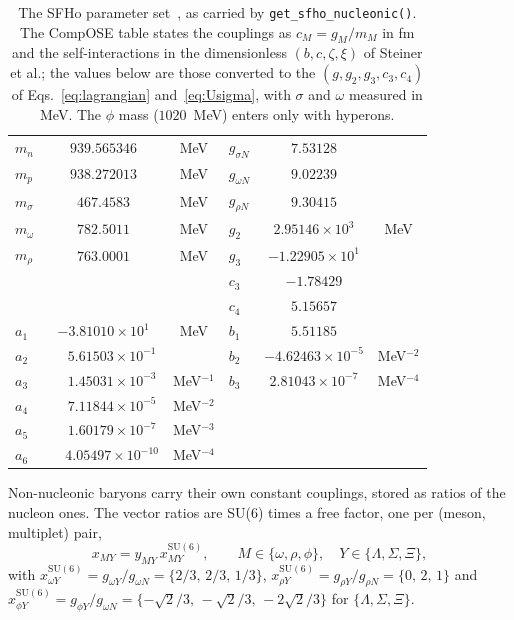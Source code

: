 \documentclass[aps,prc,onecolumn,superscriptaddress,nofootinbib,10pt]{revtex4-2}
\begin{document}
\begin{table}[b]
\caption{The SFHo parameter set~\cite{Steiner2013}, as carried by
\texttt{get\_sfho\_nucleonic()}. The CompOSE table states the couplings as
$c_M = g_M/m_M$ in fm and the self-interactions in the dimensionless
$(b, c, \zeta, \xi)$ of Steiner et al.; the values below are those converted
to the $(g, g_2, g_3, c_3, c_4)$ of Eqs.~\eqref{eq:lagrangian}
and~\eqref{eq:Usigma}, with $\sigma$ and $\omega$ measured in MeV. The $\phi$
mass ($1020$~MeV) enters only with hyperons.}
\label{tab:params}
\begin{ruledtabular}
\begin{tabular}{lcc|lcc}
$m_n$ & $939.565346$ & MeV & $g_{\sigma N}$ & $7.53128$ & \\
$m_p$ & $938.272013$ & MeV & $g_{\omega N}$ & $9.02239$ & \\
$m_\sigma$ & $467.4583$ & MeV & $g_{\rho N}$ & $9.30415$ & \\
$m_\omega$ & $782.5011$ & MeV & $g_2$ & $2.95146 \times 10^{3}$ & MeV \\
$m_\rho$ & $763.0001$ & MeV & $g_3$ & $-1.22905 \times 10^{1}$ & \\
 & & & $c_3$ & $-1.78429$ & \\
 & & & $c_4$ & $5.15657$ & \\
\hline
$a_1$ & $-3.81010\times 10^{1}$ & MeV & $b_1$ & $5.51185$ & \\
$a_2$ & $\phantom{-}5.61503\times 10^{-1}$ & & $b_2$ & $-4.62463\times 10^{-5}$ & MeV$^{-2}$ \\
$a_3$ & $\phantom{-}1.45031\times 10^{-3}$ & MeV$^{-1}$ & $b_3$ & $2.81043\times 10^{-7}$ & MeV$^{-4}$ \\
$a_4$ & $\phantom{-}7.11844\times 10^{-5}$ & MeV$^{-2}$ & & & \\
$a_5$ & $\phantom{-}1.60179\times 10^{-7}$ & MeV$^{-3}$ & & & \\
$a_6$ & $\phantom{-}4.05497\times 10^{-10}$ & MeV$^{-4}$ & & & \\
\end{tabular}
\end{ruledtabular}
\end{table}

Non-nucleonic baryons carry their own constant couplings, stored as ratios of
the nucleon ones. The vector ratios are SU(6) times a free factor, one per
(meson, multiplet) pair,
%
\begin{equation}
x_{M Y} = y_{M Y}\, x_{M Y}^{\mathrm{SU(6)}},
\qquad M \in \{\omega, \rho, \phi\},\quad
Y \in \{\Lambda, \Sigma, \Xi\},
\label{eq:su6break}
\end{equation}
%
with $x^{\mathrm{SU(6)}}_{\omega Y} = g_{\omega Y}/g_{\omega N}
 = \{2/3,\, 2/3,\, 1/3\}$,
$x^{\mathrm{SU(6)}}_{\rho Y} = g_{\rho Y}/g_{\rho N} = \{0,\, 2,\, 1\}$ and
$x^{\mathrm{SU(6)}}_{\phi Y} = g_{\phi Y}/g_{\omega N}
 = \{-\sqrt2/3,\, -\sqrt2/3,\, -2\sqrt2/3\}$ for $\{\Lambda, \Sigma, \Xi\}$.
\end{document}
